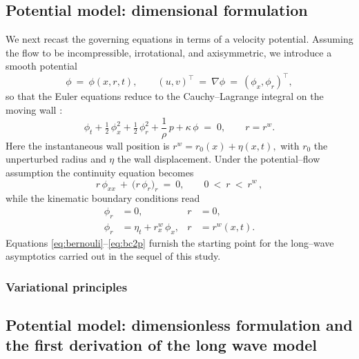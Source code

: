 \documentclass[alpha-refs, 12pt]{wiley-article}
\begin{document}
\subsection{Potential model: dimensional formulation}

We next recast the governing equations in terms of a velocity potential. Assuming the flow to be incompressible, irrotational, and axisymmetric, we introduce a smooth potential
\[
  \phi\ =\ \phi(x,r,t),\qquad
  (u,v)^{\top}\ =\ \nabla\phi\ =\ (\phi_{x},\phi_{r})^{\top},
\]
so that the Euler equations reduce to the Cauchy--Lagrange integral on the moving wall \cite{Mitsotakis2019}:
\begin{equation}\label{eq:bernouli}
  \phi_{t}
  +\tfrac{1}{2}\,\phi_{x}^{2}
  +\tfrac{1}{2}\,\phi_{r}^{2}
  +\frac{1}{\rho}\,p
  +\kappa\,\phi
  \;=\;0,
  \qquad
  r=r^{w}.
\end{equation}
Here the instantaneous wall position is
\(
  r^{w}=r_{0}(x)+\eta(x,t),
\)
with $r_{0}$ the unperturbed radius and $\eta$ the wall displacement. Under the potential–flow assumption the continuity equation becomes
\begin{equation}\label{eq:massp}
  r\,\phi_{xx}\ +\ \bigl(r\,\phi_{r}\bigr)_{r}\ =\ 0, \qquad 0\ <\ r\ <\ r^{w}\,,
\end{equation}
while the kinematic boundary conditions read
\begin{align}
  \phi_{r}&=0,
  & r&=0, \label{eq:bc1p}\\[2pt]
  \phi_{r}&=\eta_{t}+r^{w}_{x}\,\phi_{x},
  & r&=r^{w}(x,t).\label{eq:bc2p}
\end{align}
Equations \eqref{eq:bernouli}--\eqref{eq:bc2p} furnish the starting point for the long–wave asymptotics carried out in the sequel of this study.

\subsubsection{Variational principles}



\subsection{Potential model: dimensionless formulation and the first derivation of the long wave model}\label{sec:dimless_longwave}
\end{document}
